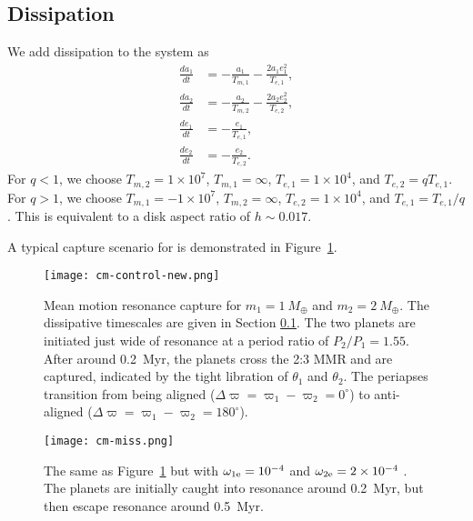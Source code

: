 \documentclass[usenatbib,twocolumn]{mnras}
\begin{document}
\subsection{Dissipation}\label{sec:cm-dis}
We add dissipation to the system as
\begin{align}
 \frac{da_1}{dt} &=- \frac{a_{1}}{T_{m,1}} - \frac{2 a_{1} e_{1}^{2}}{T_{e,1}},\\
 \frac{da_2}{dt} &=- \frac{a_{2}}{T_{m,2}} - \frac{2 a_{2} e_{2}^{2}}{T_{e,2}},\\
 \frac{de_1}{dt} &=- \frac{e_{1}}{T_{e,1}},\\
 \frac{de_2}{dt} &=- \frac{e_{2}}{T_{e,2}}.
\end{align}
For $q<1$, we choose $T_{m,2}=1\times10^7$, $T_{m,1}=\infty$, $T_{e,1}=1\times10^4$, and $T_{e,2}=qT_{e,1}$.
For $q>1$, we choose $T_{m,1}=-1\times10^7$, $T_{m,2}=\infty$, $T_{e,2}=1\times10^4$, and $T_{e,1}=T_{e,1}/q$.
This is equivalent to a disk aspect ratio of $h\sim 0.017$.

A typical capture scenario for is demonstrated in Figure~\ref{fig:cm-control}.

\begin{figure}
    \texttt{[image: cm-control-new.png]}
\caption{Mean motion resonance capture for $m_1=1~M_\oplus$ and $m_2=2~M_\oplus$. The dissipative timescales are given in Section \ref{sec:cm-dis}. The two planets are initiated just wide of resonance at a period ratio of $P_2/P_1=1.55$. After around 0.2~Myr, the planets cross the 2:3 MMR and are captured, indicated by the tight libration of $\theta_1$ and $\theta_2$. The periapses transition from being aligned ($\Delta\varpi=\varpi_1-\varpi_2=0^\circ$) to anti-aligned ($\Delta\varpi=\varpi_1-\varpi_2=180^\circ$).}
    \label{fig:cm-control}
\end{figure}

\begin{figure}
    \texttt{[image: cm-miss.png]}
    \caption{The same as Figure~\ref{fig:cm-control} but with $\omega_{1\rm e}=10^{-4}$ and $\omega_{2\rm e}=2\times10^{-4}$ . 
    The planets are initially caught into resonance around 0.2~Myr, but then escape resonance around 0.5~Myr. 
    }
    \label{fig:cm-neg-dDpom}
\end{figure}
\end{document}
